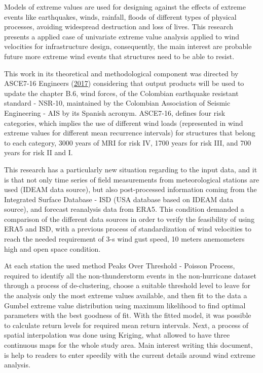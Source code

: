 \documentclass[12pt,oneside]{reedthesis}
\begin{document}
  \begin{preface}
    Models of extreme values are used for designing against the effects of extreme events like earthquakes, winds, rainfall, floods of different types of physical processes, avoiding widespread destruction and loss of lives. This research presents a applied case of univariate extreme value analysis applied to wind velocities for infrastructure design, consequently, the main interest are probable future more extreme wind events that structures need to be able to resist.
    
    This work in its theoretical and methodological component was directed by ASCE7-16 Engineers (\protect\hyperlink{ref-Asce2017}{2017}) considering that output products will be used to update the chapter B.6, wind forces, of the Colombian earthquake resistant standard - NSR-10, maintained by the Colombian Association of Seismic Engineering - AIS by its Spanish acronym. ASCE7-16, defines four risk categories, which implies the use of different wind loads (represented in wind extreme values for different mean recurrence intervals) for structures that belong to each category, 3000 years of MRI for risk IV, 1700 years for risk III, and 700 years for risk II and I.
    
    This research has a particularly new situation regarding to the input data, and it is that not only time series of field measurements from meteorological stations are used (IDEAM data source), but also post-processed information coming from the Integrated Surface Database - ISD (USA database based on IDEAM data source), and forecast reanalysis data from ERA5. This condition demanded a comparison of the different data sources in order to verify the feasibility of using ERA5 and ISD, with a previous process of standardization of wind velocities to reach the needed requirement of 3-s wind gust speed, 10 meters anemometers high and open space condition.
    
    At each station the used method Peaks Over Threshold - Poisson Process, required to identify all the non-thunderstorm events in the non-hurricane dataset through a process of de-clustering, choose a suitable threshold level to leave for the analysis only the most extreme values available, and then fit to the data a Gumbel extreme value distribution using maximum likelihood to find optimal parameters with the best goodness of fit. With the fitted model, it was possible to calculate return levels for required mean return intervals. Next, a process of spatial interpolation was done using Kriging, what allowed to have three continuous maps for the whole study area. Main interest writing this document, is help to readers to enter speedily with the current details around wind extreme analysis.
  \end{preface}
  \hypersetup{linkcolor=black}
  \setcounter{tocdepth}{4}
  \tableofcontents
\end{document}

